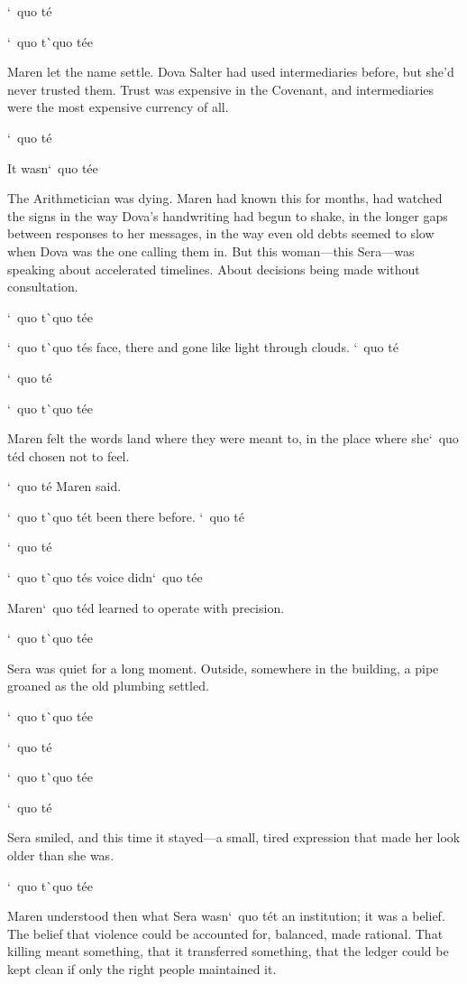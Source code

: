 \documentclass[12pt,letterpaper,openany]{book}
\begin{document}
\par
`\ quo t\'e{}
\par
`\ quo t\`\ quo t\'e{}e{}
\par
Maren let the name settle. Dova Salter had used intermediaries before, but she'd never trusted them. Trust was expensive in the Covenant, and intermediaries were the most expensive currency of all.
\par
`\ quo t\'e{}
\par
It wasn`\ quo t\'e{}e{}
\par
The Arithmetician was dying. Maren had known this for months, had watched the signs in the way Dova's handwriting had begun to shake, in the longer gaps between responses to her messages, in the way even old debts seemed to slow when Dova was the one calling them in. But this woman—this Sera—was speaking about accelerated timelines. About decisions being made without consultation.
\par
`\ quo t\`\ quo t\'e{}e{}
\par
`\ quo t\`\ quo t\'e{}s face, there and gone like light through clouds. `\ quo t\'e{}
\par
`\ quo t\'e{}
\par
`\ quo t\`\ quo t\'e{}e{}
\par
Maren felt the words land where they were meant to, in the place where she`\ quo t\'e{}d chosen not to feel.
\par
`\ quo t\'e{} Maren said.
\par
`\ quo t\`\ quo t\'e{}t been there before. `\ quo t\'e{}
\par
`\ quo t\'e{}
\par
`\ quo t\`\ quo t\'e{}s voice didn`\ quo t\'e{}e{}
\par
Maren`\ quo t\'e{}d learned to operate with precision.
\par
`\ quo t\`\ quo t\'e{}e{}
\par
Sera was quiet for a long moment. Outside, somewhere in the building, a pipe groaned as the old plumbing settled.
\par
`\ quo t\`\ quo t\'e{}e{}
\par
`\ quo t\'e{}
\par
`\ quo t\`\ quo t\'e{}e{}
\par
`\ quo t\'e{}
\par
Sera smiled, and this time it stayed—a small, tired expression that made her look older than she was.
\par
`\ quo t\`\ quo t\'e{}e{}
\par
Maren understood then what Sera wasn`\ quo t\'e{}t an institution; it was a belief. The belief that violence could be accounted for, balanced, made rational. That killing meant something, that it transferred something, that the ledger could be kept clean if only the right people maintained it.
\end{document}
